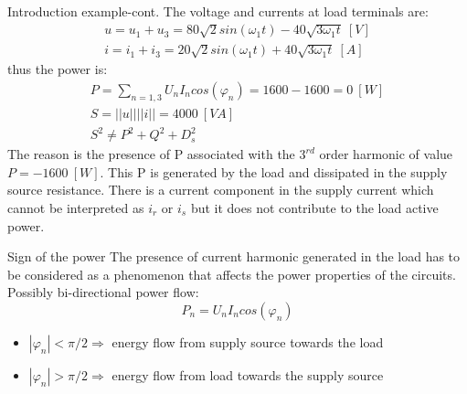 \documentclass[aspectratio=169]{beamer}
\begin{document}
\begin{frame}{Introduction example-cont.}{\insertsection}
    The voltage and currents at load terminals are:
    \begin{gather}
      u=u_1+u_3 = 80\sqrt{2}sin(\omega_1t)-40\sqrt{3\omega_1t} \ \left[V\right]\\
      i=i_1+i_3 = 20\sqrt{2}sin(\omega_1t)+40\sqrt{3\omega_1t} \ \left[A\right]
    \end{gather}
    thus the power is: 
    \begin{gather}
      P=\sum_{n=1,3}U_nI_n cos(\varphi_n)=1600-1600=0 \ \left[W\right]\\
      S = ||u||||i|| = 4000 \ \left[VA\right]\\
      S^2 \ne P^2+Q^2+D_s^2
    \end{gather}
    The reason is the presence of P associated with the $3^{rd}$ order harmonic of value $P=-1600\ \left[W\right]$. This P is generated by the load and dissipated in the supply source resistance. \textcolor{NTNU_orange}{There is a current component in the supply current which cannot be interpreted as $i_r$ or $i_s$ but it does not contribute to the load active power.}
  \end{frame}

  \begin{frame}{Sign of the power}{\insertsection}
    \textcolor{NTNU_orange}{The presence of current harmonic generated in the load has to be considered as a phenomenon that affects the power properties of the circuits.}\\
    Possibly bi-directional power flow:
    \begin{equation}
      P_n = U_nI_n cos(\varphi_n)
    \end{equation}
    \begin{itemize}
      \item $|\varphi_n|<\pi/2 \Rightarrow$ energy flow from \textcolor{NTNU_blue}{supply source} towards the \textcolor{NTNU_green}{load}
      \item $|\varphi_n| >\pi/2 \Rightarrow$ energy flow  from \textcolor{NTNU_green}{load} towards the \textcolor{NTNU_blue}{supply source}
    \end{itemize}
\end{frame}
\end{document}
